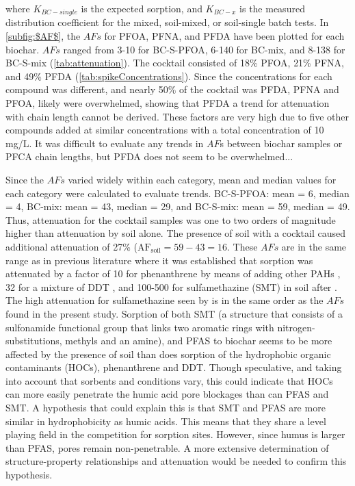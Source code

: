 where $K_{BC-single}$ is the expected sorption, and $K_{BC-x}$ is the measured distribution coefficient for the mixed, soil-mixed, or soil-single batch tests. In \cref{subfig:$AF$}, the $AFs$ for PFOA, PFNA, and PFDA have been plotted for each biochar. $AFs$ ranged from 3-10 for BC-S-PFOA, 6-140 for BC-mix, and 8-138 for BC-S-mix (\cref{tab:attenuation}). The cocktail consisted of 18\% PFOA, 21\% PFNA, and 49\% PFDA (\cref{tab:spikeConcentrations}). Since the concentrations for each compound was different, and nearly 50\% of the cocktail was PFDA, PFNA and PFOA, likely were overwhelmed, showing that PFDA  a trend for attenuation with chain length cannot be derived. These factors are very high due to five other compounds added at similar concentrations with a total concentration of 10 mg/L. It was difficult to evaluate any trends in $AF$s between biochar samples or PFCA chain lengths, but PFDA does not seem to be overwhelmed... 

Since the $AFs$ varied widely within each category, mean and median values for each category were calculated to evaluate trends. BC-S-PFOA: mean = 6, median = 4, BC-mix: mean = 43, median = 29, and BC-S-mix: mean = 59, median = 49. Thus, attenuation for the cocktail samples was one to two orders of magnitude higher than attenuation by soil alone. The presence of soil with a cocktail caused additional attenuation of 27\% ($\mathrm{AF_{soil} = 59-43 = 16}$. These $AFs$ are in the same range as in previous literature where it was established that sorption was attenuated by a factor of 10 for phenanthrene by means of adding other PAHs \citep{Cornelissen2006}, 32 for a mixture of DDT \citep{hale2009sorption}, and 100-500 for sulfamethazine (SMT) in soil after \cite{Teixido2013}. The high attenuation for sulfamethazine seen by \cite{Teixido2013} is in the same order as the $AFs$ found in the present study. Sorption of both SMT (a structure  that consists of a sulfonamide functional group that links two aromatic rings with nitrogen-substitutions, methyls and an amine), and PFAS to biochar seems to be more affected by the presence of soil than does sorption of the hydrophobic organic contaminants (HOCs), phenanthrene and DDT. Though speculative, and taking into account that sorbents and conditions vary, this could indicate that HOCs can more easily penetrate the humic acid pore blockages than can PFAS and SMT. A hypothesis that could explain this is that SMT and PFAS are more similar in hydrophobicity as humic acids. This means that they share a level playing field in the competition for sorption sites. However, since humus is larger than PFAS, pores remain non-penetrable. A more extensive determination of structure-property relationships and attenuation would be needed to confirm this hypothesis. 

